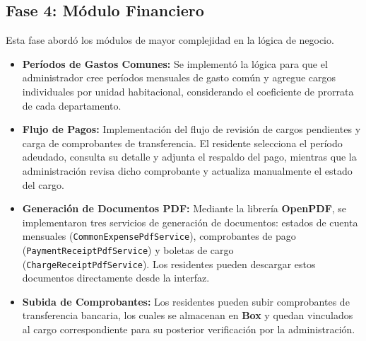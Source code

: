 \subsection{Fase 4: Módulo Financiero}
Esta fase abordó los módulos de mayor complejidad en la lógica de negocio.
\begin{itemize}
    \item \textbf{Períodos de Gastos Comunes:} Se implementó la lógica para que el administrador cree períodos mensuales de gasto común y agregue cargos individuales por unidad habitacional, considerando el coeficiente de prorrata de cada departamento.
    \item \textbf{Flujo de Pagos:} Implementación del flujo de revisión de cargos pendientes y carga de comprobantes de transferencia. El residente selecciona el período adeudado, consulta su detalle y adjunta el respaldo del pago, mientras que la administración revisa dicho comprobante y actualiza manualmente el estado del cargo.
    \item \textbf{Generación de Documentos PDF:} Mediante la librería \textbf{OpenPDF}, se implementaron tres servicios de generación de documentos: estados de cuenta mensuales (\texttt{CommonExpensePdfService}), comprobantes de pago (\texttt{PaymentReceiptPdfService}) y boletas de cargo (\texttt{ChargeReceiptPdfService}). Los residentes pueden descargar estos documentos directamente desde la interfaz.
    \item \textbf{Subida de Comprobantes:} Los residentes pueden subir comprobantes de transferencia bancaria, los cuales se almacenan en \textbf{Box} y quedan vinculados al cargo correspondiente para su posterior verificación por la administración.
\end{itemize}

